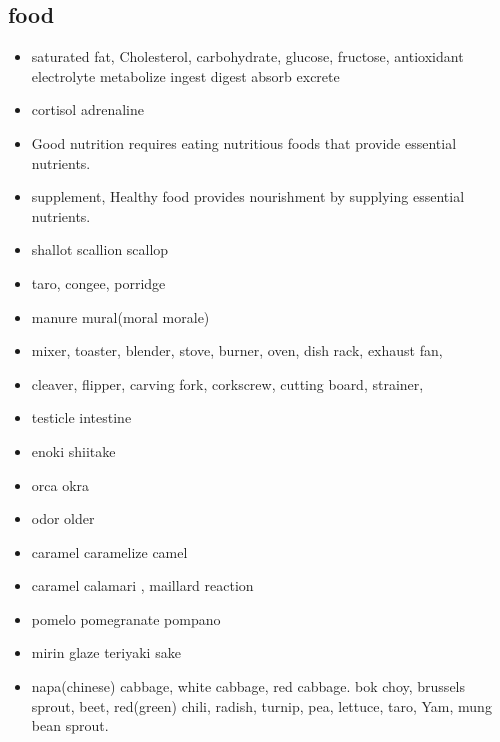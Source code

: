\documentclass[a4paper,11pt,twoside]{book}
\begin{document}
\subsection{food}
\begin{itemize}
	\item saturated fat, Cholesterol, carbohydrate, glucose, fructose, antioxidant electrolyte 
	metabolize ingest digest absorb excrete
	
	\item cortisol adrenaline 
	
	\item Good nutrition requires eating nutritious foods that provide essential nutrients.
	
	\item supplement,  Healthy food provides nourishment by supplying essential nutrients.

	\item shallot scallion scallop
	
	\item taro, congee, porridge

	\item manure mural(moral morale)
	
	\item mixer, toaster, blender, stove, burner, oven, dish rack, exhaust fan, 
	
	\item cleaver, flipper, carving fork, corkscrew, cutting board, strainer, 
	
	\item testicle intestine
	
	\item enoki shiitake
	
	\item orca okra
	
	\item odor older

	\item caramel caramelize camel
	
	\item caramel calamari , maillard reaction
	
	\item pomelo pomegranate pompano

	\item mirin glaze teriyaki sake
	
	\item napa(chinese) cabbage, white cabbage, red cabbage. bok choy, brussels sprout, beet, red(green) chili, radish, turnip, pea, lettuce, taro, Yam, mung bean sprout. 
	

\end{itemize}
\end{document}
